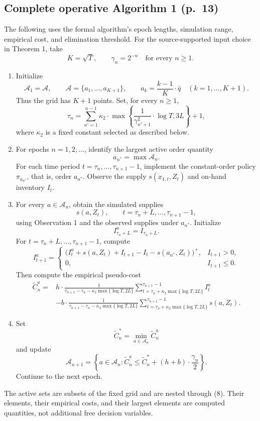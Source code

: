 \documentclass{article}
\begin{document}
\subsection*{Complete operative Algorithm 1 (p.\ 13)}
The following uses the formal algorithm's epoch lengths, simulation range, empirical cost, and elimination threshold. For the source-supported input choice in Theorem 1, take
\[
K=\sqrt T,\qquad\gamma_n=2^{-n}\quad\text{for every }n\geq1.
\]
\begin{enumerate}
\item Initialize
\[
\mathcal A_1=\mathcal A,\qquad
\mathcal A=\{a_1,\ldots,a_{K+1}\},\qquad
 a_k=\frac{k-1}{K}\cdot\bar q\quad(k=1,\ldots,K+1).
\]
Thus the grid has \(K+1\) points. Set, for every \(n\geq1\),
\[
\tau_n=\sum_{n'=1}^{n-1}\kappa_2\cdot
\max\left\{\frac{1}{\gamma_{n'+1}^{2}}\cdot\log T,3L\right\}+1,
\]
where \(\kappa_2\) is a fixed constant selected as described below.

\item For epochs \(n=1,2,\ldots\), identify the largest active order quantity
\[
a_{n^*}=\max\mathcal A_n.
\]
For each time period \(t=\tau_n,\ldots,\tau_{n+1}-1\), implement the constant-order policy \(\pi_{a_{n^*}}\), that is, order \(a_{n^*}\). Observe the supply \(s(x_{1,t},Z_t)\) and on-hand inventory \(I_t\).

\item For every \(a\in\mathcal A_n\), obtain the simulated supplies
\[
s(a,Z_t),\qquad t=\tau_n+L,\ldots,\tau_{n+1}-1,
\]
using Observation 1 and the observed supplies under \(a_{n^*}\). Initialize
\[
I^a_{\tau_n+L}=I_{\tau_n+L}.
\]
For \(t=\tau_n+L,\ldots,\tau_{n+1}-1\), compute
\[
I^a_{t+1}=\begin{cases}
\big(I^a_t+s(a,Z_t)+I_{t+1}-I_t-s(a_{n^*},Z_t)\big)^+,
& I_{t+1}>0,\\
0,&I_{t+1}\leq0.
\end{cases}
\]
Then compute the empirical pseudo-cost
\begin{align*}
\tilde C_n^a
={}&h\cdot\frac{1}{\tau_{n+1}-\tau_n-\kappa_2\max\{\log T,2L\}}
\sum_{t=\tau_n+\kappa_2\max\{\log T,2L\}}^{\tau_{n+1}-1} I_t^a\\
&-b\cdot\frac{1}{\tau_{n+1}-\tau_n-\kappa_2\max\{\log T,2L\}}
\sum_{t=\tau_n+\kappa_2\max\{\log T,2L\}}^{\tau_{n+1}-1}s(a,Z_t).
\end{align*}

\item Set
\[
\tilde C_n^*=\min_{a\in\mathcal A_n}\tilde C_n^a
\]
and update
\begin{equation}
\mathcal A_{n+1}
=\left\{a\in\mathcal A_n:
\tilde C_n^a\leq\tilde C_n^*+(h+b)\cdot\frac{\gamma_n}{2}\right\}.\tag{8}
\end{equation}
Continue to the next epoch.
\end{enumerate}
The active sets are subsets of the fixed grid and are nested through (8). Their elements, their empirical costs, and their largest elements are computed quantities, not additional free decision variables.
\end{document}
